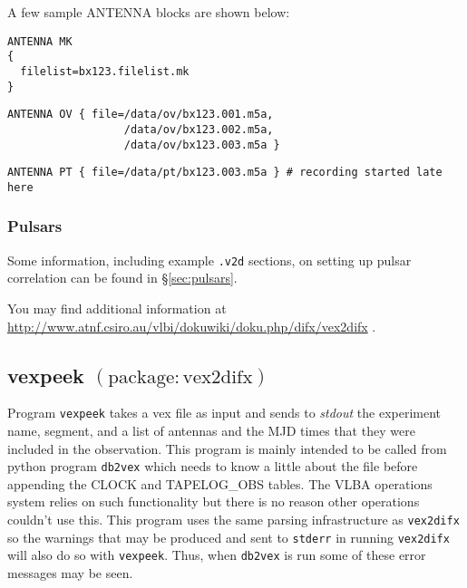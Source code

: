 A few sample ANTENNA blocks are shown below:

\begin{verbatim}
ANTENNA MK 
{
  filelist=bx123.filelist.mk
}
\end{verbatim}

\begin{verbatim}
ANTENNA OV { file=/data/ov/bx123.001.m5a, 
                  /data/ov/bx123.002.m5a,
                  /data/ov/bx123.003.m5a }
\end{verbatim}

\begin{verbatim}
ANTENNA PT { file=/data/pt/bx123.003.m5a } # recording started late here
\end{verbatim}


\subsubsection{Pulsars}

Some information, including example {\tt .v2d} sections, on setting up pulsar correlation can be found in \S\ref{sec:pulsars}.


You may find additional information at \url{http://www.atnf.csiro.au/vlbi/dokuwiki/doku.php/difx/vex2difx} .







\subsection{vexpeek {\small $\mathrm{(package: vex2difx)}$}} \label{sec:vexpeek}

Program {\tt vexpeek} takes a vex file as input and sends to {\em stdout} the experiment name, segment, and a list of antennas and the MJD times that they were included in the observation.
This program is mainly intended to be called from python program {\tt db2vex} which needs to know a little about the file before appending the CLOCK and TAPELOG\_OBS tables.  
The VLBA operations system relies on such functionality but there is no reason other operations couldn't use this.
This program uses the same parsing infrastructure as {\tt vex2difx} so the warnings that may be produced and sent to {\tt stderr} in running {\tt vex2difx} will also do so with {\tt vexpeek}.
Thus, when {\tt db2vex} is run some of these error messages may be seen.

